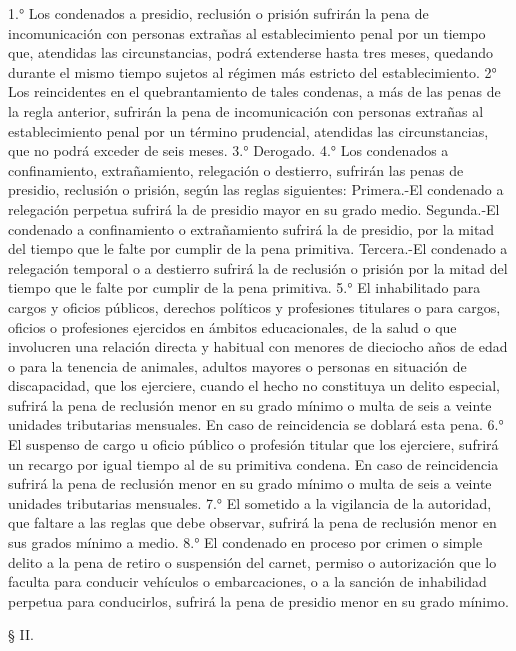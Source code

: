     1.° Los condenados a presidio, reclusión o prisión sufrirán la pena de incomunicación con personas extrañas al establecimiento penal por un tiempo que, atendidas las circunstancias, podrá extenderse hasta tres meses, quedando durante el mismo tiempo sujetos al régimen más estricto del establecimiento.
    2° Los reincidentes en el quebrantamiento de tales condenas, a más de las penas de la regla anterior, sufrirán la pena de incomunicación con personas extrañas al establecimiento penal por un término prudencial, atendidas las circunstancias, que no podrá exceder de seis meses.
    3.° Derogado.
    4.° Los condenados a confinamiento, extrañamiento, relegación o destierro, sufrirán las penas de presidio, reclusión o prisión, según las reglas siguientes:
    Primera.-El condenado a relegación perpetua sufrirá la de presidio mayor en su grado medio.
    Segunda.-El condenado a confinamiento o extrañamiento sufrirá la de presidio, por la mitad del tiempo que le falte por cumplir de la pena primitiva.
    Tercera.-El condenado a relegación temporal o a destierro sufrirá la de reclusión o prisión por la mitad del tiempo que le falte por cumplir de la pena primitiva.
    5.° El inhabilitado para cargos y oficios públicos, derechos políticos y profesiones titulares o para cargos, oficios o profesiones ejercidos en ámbitos educacionales, de la salud o que involucren una relación directa y habitual con menores de dieciocho años de edad o para la tenencia de animales, adultos mayores o personas en situación de discapacidad, que los ejerciere, cuando el hecho no constituya un delito especial, sufrirá la pena de reclusión menor en su grado mínimo o multa de seis a veinte unidades tributarias mensuales.
    En caso de reincidencia se doblará esta pena.
    6.° El suspenso de cargo u oficio público o profesión titular que los ejerciere, sufrirá un recargo por igual tiempo al de su primitiva condena.
    En caso de reincidencia sufrirá la pena de reclusión menor en su grado mínimo o multa de seis a veinte unidades tributarias mensuales.
    7.° El sometido a la vigilancia de la autoridad, que faltare a las reglas que debe observar, sufrirá la pena de reclusión menor en sus grados mínimo a medio.
    8.° El condenado en proceso por crimen o simple delito a la pena de retiro o suspensión del carnet, permiso o autorización que lo faculta para conducir vehículos o embarcaciones, o a la sanción de inhabilidad perpetua para conducirlos, sufrirá la pena de presidio menor en su grado mínimo.


    § II.

